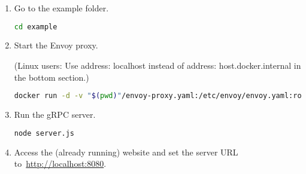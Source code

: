 \begin{enumerate}
    \item Go to the example folder.
    \begin{lstlisting}[language=bash, label={lst:documentation-testing-cd-example}]
cd example
    \end{lstlisting}

    \item Start the Envoy proxy.
    
    (Linux users: Use address: localhost instead of address: host.docker.internal in the bottom section.)

    \begin{lstlisting}[language=bash, label={lst:documentation-testing-envoy}, breaklines=true]
docker run -d -v "$(pwd)"/envoy-proxy.yaml:/etc/envoy/envoy.yaml:ro -p 8080:8080 -p 9901:9901 envoyproxy/envoy:v1.22.0
    \end{lstlisting}

    \item Run the gRPC server.
    \begin{lstlisting}[language=bash, label={lst:documentation-testing-node}]
node server.js
    \end{lstlisting}

    \item Access the (already running) website and set the server URL to~\url{http://localhost:8080}.

\end{enumerate}
